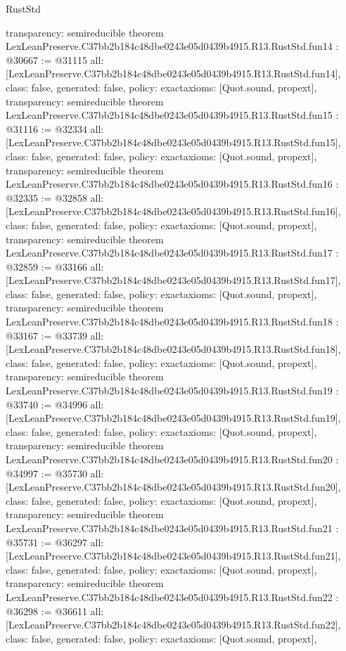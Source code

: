 \begin{lexlean}{RustStd}
\begin{coremodule}
{  transparency: semireducible
}
theorem LexLeanPreserve.C37bb2b184c48dbe0243e05d0439b4915.R13.RustStd.fun14 : @30667 := @31115 {
  all: [LexLeanPreserve.C37bb2b184c48dbe0243e05d0439b4915.R13.RustStd.fun14],
  class: false,
  generated: false,
  policy: exact{axioms: [Quot.sound, propext]},
  transparency: semireducible
}
theorem LexLeanPreserve.C37bb2b184c48dbe0243e05d0439b4915.R13.RustStd.fun15 : @31116 := @32334 {
  all: [LexLeanPreserve.C37bb2b184c48dbe0243e05d0439b4915.R13.RustStd.fun15],
  class: false,
  generated: false,
  policy: exact{axioms: [Quot.sound, propext]},
  transparency: semireducible
}
theorem LexLeanPreserve.C37bb2b184c48dbe0243e05d0439b4915.R13.RustStd.fun16 : @32335 := @32858 {
  all: [LexLeanPreserve.C37bb2b184c48dbe0243e05d0439b4915.R13.RustStd.fun16],
  class: false,
  generated: false,
  policy: exact{axioms: [Quot.sound, propext]},
  transparency: semireducible
}
theorem LexLeanPreserve.C37bb2b184c48dbe0243e05d0439b4915.R13.RustStd.fun17 : @32859 := @33166 {
  all: [LexLeanPreserve.C37bb2b184c48dbe0243e05d0439b4915.R13.RustStd.fun17],
  class: false,
  generated: false,
  policy: exact{axioms: [Quot.sound, propext]},
  transparency: semireducible
}
theorem LexLeanPreserve.C37bb2b184c48dbe0243e05d0439b4915.R13.RustStd.fun18 : @33167 := @33739 {
  all: [LexLeanPreserve.C37bb2b184c48dbe0243e05d0439b4915.R13.RustStd.fun18],
  class: false,
  generated: false,
  policy: exact{axioms: [Quot.sound, propext]},
  transparency: semireducible
}
theorem LexLeanPreserve.C37bb2b184c48dbe0243e05d0439b4915.R13.RustStd.fun19 : @33740 := @34996 {
  all: [LexLeanPreserve.C37bb2b184c48dbe0243e05d0439b4915.R13.RustStd.fun19],
  class: false,
  generated: false,
  policy: exact{axioms: [Quot.sound, propext]},
  transparency: semireducible
}
theorem LexLeanPreserve.C37bb2b184c48dbe0243e05d0439b4915.R13.RustStd.fun20 : @34997 := @35730 {
  all: [LexLeanPreserve.C37bb2b184c48dbe0243e05d0439b4915.R13.RustStd.fun20],
  class: false,
  generated: false,
  policy: exact{axioms: [Quot.sound, propext]},
  transparency: semireducible
}
theorem LexLeanPreserve.C37bb2b184c48dbe0243e05d0439b4915.R13.RustStd.fun21 : @35731 := @36297 {
  all: [LexLeanPreserve.C37bb2b184c48dbe0243e05d0439b4915.R13.RustStd.fun21],
  class: false,
  generated: false,
  policy: exact{axioms: [Quot.sound, propext]},
  transparency: semireducible
}
theorem LexLeanPreserve.C37bb2b184c48dbe0243e05d0439b4915.R13.RustStd.fun22 : @36298 := @36611 {
  all: [LexLeanPreserve.C37bb2b184c48dbe0243e05d0439b4915.R13.RustStd.fun22],
  class: false,
  generated: false,
  policy: exact{axioms: [Quot.sound, propext]},
}
\end{coremodule}
\end{lexlean}
